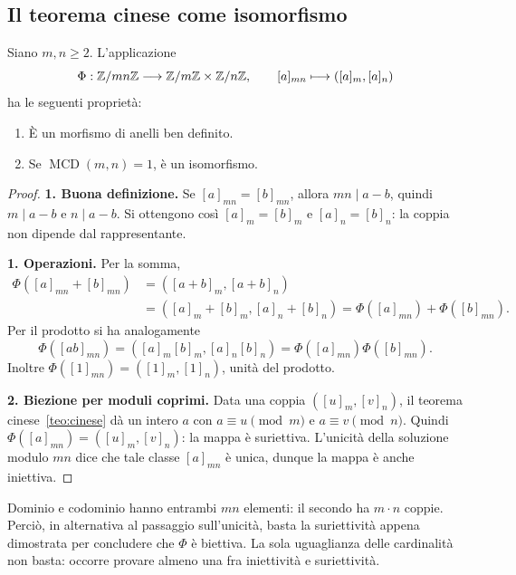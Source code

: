 \subsection{Il teorema cinese come isomorfismo}
\begin{proposizione}\label{prop:crt-morfismo}
Siano $m,n\ge2$. L'applicazione
\[
\Phi:\mathbb{Z}/mn\mathbb{Z}\longrightarrow\mathbb{Z}/m\mathbb{Z}\times\mathbb{Z}/n\mathbb{Z},
\qquad [a]_{mn}\longmapsto([a]_m,[a]_n)
\]
ha le seguenti proprietà:
\begin{enumerate}[label=\arabic*.]
\item È un morfismo di anelli ben definito.
\item Se $\operatorname{MCD}(m,n)=1$, è un isomorfismo.
\end{enumerate}
\end{proposizione}
\begin{proof}
\textbf{1. Buona definizione.} Se $[a]_{mn}=[b]_{mn}$, allora $mn\mid a-b$, quindi $m\mid a-b$ e $n\mid a-b$. Si ottengono così $[a]_m=[b]_m$ e $[a]_n=[b]_n$: la coppia non dipende dal rappresentante.

\textbf{1. Operazioni.} Per la somma,
\[
\begin{aligned}
\Phi([a]_{mn}+[b]_{mn})
 &=([a+b]_m,[a+b]_n)\\
 &=([a]_m+[b]_m,[a]_n+[b]_n)
 =\Phi([a]_{mn})+\Phi([b]_{mn}).
\end{aligned}
\]
Per il prodotto si ha analogamente
\[
\Phi([ab]_{mn})=([a]_m[b]_m,[a]_n[b]_n)
              =\Phi([a]_{mn})\Phi([b]_{mn}).
\]
Inoltre $\Phi([1]_{mn})=([1]_m,[1]_n)$, unità del prodotto.

\textbf{2. Biezione per moduli coprimi.} Data una coppia $([u]_m,[v]_n)$, il teorema cinese~\ref{teo:cinese} dà un intero $a$ con $a\equiv u\pmod m$ e $a\equiv v\pmod n$. Quindi $\Phi([a]_{mn})=([u]_m,[v]_n)$: la mappa è suriettiva. L'unicità della soluzione modulo $mn$ dice che tale classe $[a]_{mn}$ è unica, dunque la mappa è anche iniettiva.
\end{proof}

\begin{osservazione}
Dominio e codominio hanno entrambi $mn$ elementi: il secondo ha $m\cdot n$ coppie. Perciò, in alternativa al passaggio sull'unicità, basta la suriettività appena dimostrata per concludere che $\Phi$ è biettiva. La sola uguaglianza delle cardinalità non basta: occorre provare almeno una fra iniettività e suriettività.
\end{osservazione}

